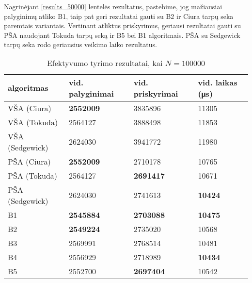 \documentclass{VUMIFInfKursinis}
\begin{document}
Nagrinėjant \ref{results_50000} lentelės rezultatus, pastebime, jog
mažiausiai palyginimų atliko B1, taip pat geri rezultatai gauti su B2 ir Ciura tarpų seka paremtais variantais.
Vertinant atliktus priskyrimus, geriausi rezultatai gauti su PŠA naudojant Tokuda tarpų seką ir B5 bei B1 algoritmais.
PŠA su Sedgewick tarpų seka rodo geriausius veikimo laiko rezultatus.

\begin{table}[H]
  \caption{Efektyvumo tyrimo rezultatai, kai $N = 100000$}
  \label{results_100000}
  \centering
  \begin{tabular}{llll}
    algoritmas & vid. palyginimai                         & vid. priskyrimai                         & vid. laikas (μs)                       \\ \midrule
    VŠA (Ciura)       & \cellcolor[HTML]{70AD47}\textbf{2552009} & 3835896                                  & 11305                                  \\
    VŠA (Tokuda)      & 2564127                                  & 3888498                                  & 11853                                  \\
    VŠA (Sedgewick)       & 2624030                                  & 3941772                                  & 11980                                  \\
    PŠA (Ciura)      & \cellcolor[HTML]{70AD47}\textbf{2552009} & 2710178                                  & 10765                                  \\
    PŠA (Tokuda)      & 2564127                                  & \cellcolor[HTML]{70AD47}\textbf{2691417} & 10671                                  \\
    PŠA (Sedgewick)      & 2624030                                  & 2741613                                  & \cellcolor[HTML]{70AD47}\textbf{10424} \\
    B1 & \cellcolor[HTML]{70AD47}\textbf{2545884} & \cellcolor[HTML]{70AD47}\textbf{2703088} & \cellcolor[HTML]{70AD47}\textbf{10475} \\
    B2      & \cellcolor[HTML]{70AD47}\textbf{2549224} & 2735020                                  & 10568                                  \\
    B3      & 2569991                                  & 2768514                                  & 10481                                  \\
    B4      & 2556929                                  & 2718989                                  & \cellcolor[HTML]{70AD47}\textbf{10434} \\
    B5      & 2552700                                  & \cellcolor[HTML]{70AD47}\textbf{2697404} & 10542                                  \\  \bottomrule 
  \end{tabular}
\end{table}
\end{document}
